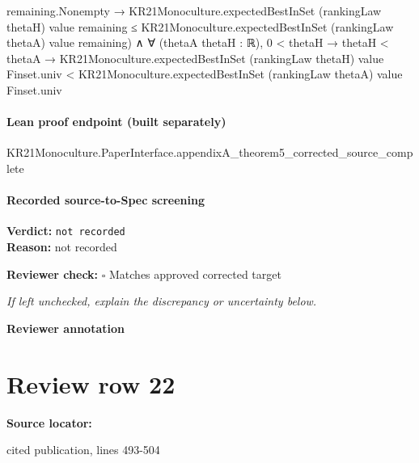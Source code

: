 \documentclass[10pt]{article}
\newcommand{\reviewerbox}{%
  \par\noindent\fbox{\parbox{0.96\linewidth}{\rule{0pt}{0.38in}}}\par
}
\newcommand{\reviewmatch}[1]{%
  \par\noindent\textbf{Reviewer check:} $\square$\; #1\par
  \noindent\emph{If left unchecked, explain the discrepancy or uncertainty below.}\par
}
\begin{document}
\begin{ReviewVerbatim}
                                          remaining.Nonempty →
                                            KR21Monoculture.expectedBestInSet (rankingLaw thetaH) value remaining ≤
                                              KR21Monoculture.expectedBestInSet (rankingLaw thetaA) value remaining) ∧
                                  ∀ (thetaA thetaH : ℝ),
                                    0 < thetaH →
                                      thetaH < thetaA →
                                        KR21Monoculture.expectedBestInSet (rankingLaw thetaH) value Finset.univ <
                                          KR21Monoculture.expectedBestInSet (rankingLaw thetaA) value Finset.univ
\end{ReviewVerbatim}

\paragraph{Lean proof endpoint (built separately)}\begin{ReviewVerbatim}
KR21Monoculture.PaperInterface.appendixA_theorem5_corrected_source_complete
\end{ReviewVerbatim}

\paragraph{Recorded source-to-Spec screening}
\textbf{Verdict:} \texttt{not recorded}
\\
\textbf{Reason:} not recorded
\reviewmatch{Matches approved corrected target}
\noindent\textbf{Reviewer annotation}\par
\reviewerbox
\clearpage
\hypertarget{source-claim-9835a680c6142d09}{}
\section*{Review row 22}
\textbf{Source locator:} {\footnotesize\raggedright cited publication, lines 493-\allowbreak{}504\par}
\end{document}
